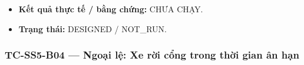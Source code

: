 \documentclass[11pt,a4paper]{article}
\providecommand{\tightlist}{%
  \setlength{\itemsep}{0pt}\setlength{\parskip}{0pt}}
\begin{document}
\begin{itemize}
  \begin{itemize}
  \tightlist
  \item
    Phiên sạc chuyển sang \texttt{GRACE\_PERIOD} sau khi đạt SoC 100\%.
  \item
    Trong 15 phút ân hạn, phiên vẫn ở trạng thái \texttt{GRACE\_PERIOD}.
  \item
    Sau khi vượt quá thời gian ân hạn, phiên chuyển sang
    \texttt{OVERSTAY}.
  \item
    Phí Overstay được tính là 10,000 VND.
  \item
    Gọi \texttt{unplug\_vehicle()} trả về phiên sạc đã kết thúc.
  \item
    Phiên sạc được loại khỏi \texttt{\_active\_sessions}.
  \end{itemize}
\item
  \textbf{Kết quả thực tế / bằng chứng:} CHƯA CHẠY.
\item
  \textbf{Trạng thái:} DESIGNED / NOT\_RUN.
\end{itemize}

\hypertarget{tc-ss5-b04-ngoux1ea1i-lux1ec7-xe-rux1eddi-cux1ed5ng-trong-thux1eddi-gian-uxe2n-hux1ea1n}{%
\subsubsection{TC-SS5-B04 --- Ngoại lệ: Xe rời cổng trong thời gian ân
hạn}\label{tc-ss5-b04-ngoux1ea1i-lux1ec7-xe-rux1eddi-cux1ed5ng-trong-thux1eddi-gian-uxe2n-hux1ea1n}}
\end{document}
